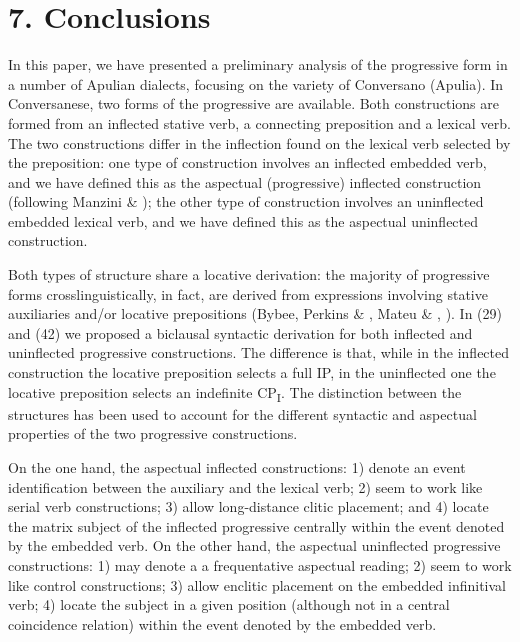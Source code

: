 \documentclass[output=paper]{langsci/langscibook}
\begin{document}
\section{ 7. Conclusions}

In this paper, we have presented a preliminary analysis of the progressive form in a number of Apulian dialects, focusing on the variety of Conversano (Apulia). In Conversanese, two forms of the progressive are available. Both constructions are formed from an inflected stative verb, a connecting preposition and a lexical verb. The two constructions differ in the inflection found on the lexical verb selected by the preposition: one type of construction involves an inflected embedded verb, and we have defined this as the aspectual (progressive) inflected construction (following Manzini \& \citealt{Savoia2005}); the other type of construction involves an uninflected embedded lexical verb, and we have defined this as the aspectual uninflected construction. 

Both types of structure share a locative derivation: the majority of progressive forms crosslinguistically, in fact, are derived from expressions involving stative auxiliaries and/or locative prepositions (Bybee, Perkins \& \citealt{Pagliuca1994}, Mateu \& \citealt{Amadas1999}, \citealt{Laka2006}). In (29) and (42) we proposed a biclausal syntactic derivation for both inflected and uninflected progressive constructions. The difference is that, while in the inflected construction the locative preposition selects a full IP, in the uninflected one the locative preposition selects an indefinite CP\textsubscript{I}. The distinction between the structures has been used to account for the different syntactic and aspectual properties of the two progressive constructions. 

 On the one hand, the aspectual inflected constructions: 1) denote an event identification between the auxiliary and the lexical verb; 2) seem to work like serial verb constructions; 3) allow long-distance clitic placement; and 4) locate the matrix subject of the inflected progressive centrally within the event denoted by the embedded verb. On the other hand, the aspectual uninflected progressive constructions: 1) may denote a a frequentative aspectual reading; 2) seem to work like control constructions; 3) allow enclitic placement on the embedded infinitival verb; 4) locate the subject in a given position (although not in a central coincidence relation) within the event denoted by the embedded verb. 
\end{document}
